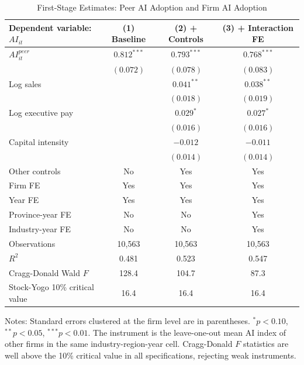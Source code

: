 \documentclass[12pt,a4paper]{article}
\theoremstyle{predstyle}
\theoremstyle{plain}
\begin{document}
\begin{table}[H]
\centering
\caption{First-Stage Estimates: Peer AI Adoption and Firm AI Adoption}
\label{tab:firststage}
\begin{threeparttable}
\small
\begin{tabular}{lccc}
\toprule
Dependent variable: \(AI_{it}\) & (1) Baseline & (2) + Controls & (3) + Interaction FE \\
\midrule
\(AI^{peer}_{it}\) & \(0.812^{***}\) & \(0.793^{***}\) & \(0.768^{***}\) \\
 & \((0.072)\) & \((0.078)\) & \((0.083)\) \\
Log sales & & \(0.041^{**}\) & \(0.038^{**}\) \\
 & & \((0.018)\) & \((0.019)\) \\
Log executive pay & & \(0.029^{*}\) & \(0.027^{*}\) \\
 & & \((0.016)\) & \((0.016)\) \\
Capital intensity & & \(-0.012\) & \(-0.011\) \\
 & & \((0.014)\) & \((0.014)\) \\
Other controls & No & Yes & Yes \\
Firm FE & Yes & Yes & Yes \\
Year FE & Yes & Yes & Yes \\
Province-year FE & No & No & Yes \\
Industry-year FE & No & No & Yes \\
\midrule
Observations & 10,563 & 10,563 & 10,563 \\
\(R^2\) & 0.481 & 0.523 & 0.547 \\
Cragg-Donald Wald \(F\) & 128.4 & 104.7 & 87.3 \\
Stock-Yogo 10\% critical value & 16.4 & 16.4 & 16.4 \\
\bottomrule
\end{tabular}
\begin{tablenotes}
\footnotesize
\item Notes: Standard errors clustered at the firm level are in parentheses. \(^{*}p<0.10\), \(^{**}p<0.05\), \(^{***}p<0.01\). The instrument is the leave-one-out mean AI index of other firms in the same industry-region-year cell. Cragg-Donald \(F\) statistics are well above the \citet{stock2005testing} 10\% critical value in all specifications, rejecting weak instruments.
\end{tablenotes}
\end{threeparttable}
\end{table}
\end{document}
